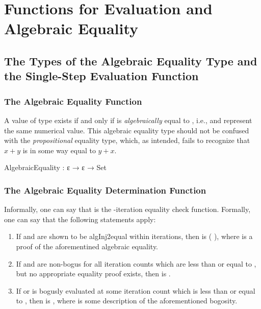 \documentclass{report}
\begin{document}
\chapter{Functions for Evaluation and Algebraic Equality}

\section{The Types of the Algebraic Equality Type and the Single-Step Evaluation Function}

\subsection{The Algebraic Equality Function}
A value of type    exists if and only if  is \emph{algebraically} equal to , i.e.,  and  represent the same numerical value.  This algebraic equality type should not be confused with the \emph{propositional} equality type, which, as intended, fails to recognize that \(x + y\) is in some way equal to \(y + x\).

\begin{code}
  AlgebraicEquality : ε → ε → Set
\end{code}

\subsection{The Algebraic Equality Determination Function}
Informally, one can say that   is the -iteration equality check function. Formally, one can say that the following statements apply:

\begin{enumerate}
  \item If  and  are shown to be \gls{algInj2equal} within  iterations, then     is  \AgdaSymbol( \AgdaSymbol), where  is a proof of the aforementined algebraic equality.\label{enum:eqCheck-just-if-equal}
  \item If  and  are non-bogus for all iteration counts which are less than or equal to , but no appropriate equality proof exists, then     is  .\label{enum:eqCheck-nothing-if-not-equal}
  \item If  or  is bogusly evaluated at some iteration count which is less than or equal to , then     is  , where  is some description of the aforementioned bogosity.\label{enum:eqCheck-inj1-if-bogus}
\end{enumerate}
\end{document}
